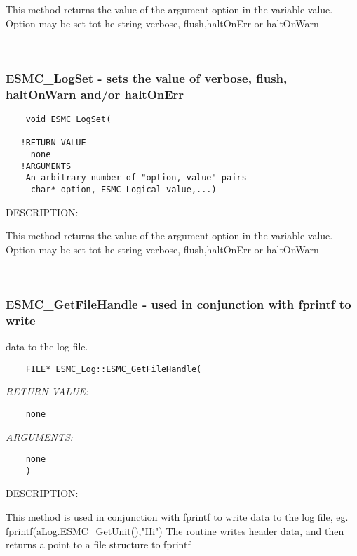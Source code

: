     This method returns the value of the argument option in the variable value.
    Option may be set tot he string verbose, flush,haltOnErr or haltOnWarn 
 
\mbox{}\hrulefill\ 
 
\subsubsection [ESMC\_LogSet] {ESMC\_LogSet - sets the value of verbose, flush, haltOnWarn and/or haltOnErr}


  
\begin{verbatim}    void ESMC_LogSet(
 
   !RETURN VALUE 
     none
   !ARGUMENTS
    An arbitrary number of "option, value" pairs
     char* option, ESMC_Logical value,...) \end{verbatim}
{\sf DESCRIPTION:\\ }


   This method returns the value of the argument option in the variable value.
   Option may be set tot he string verbose, flush,haltOnErr or haltOnWarn 
 
\mbox{}\hrulefill\ 
 
\subsubsection [ESMC\_GetFileHandle] {ESMC\_GetFileHandle - used in conjunction with fprintf to write}


   data to the log file.
  
\begin{verbatim}    FILE* ESMC_Log::ESMC_GetFileHandle(\end{verbatim}{\em RETURN VALUE:}
\begin{verbatim}    none\end{verbatim}{\em ARGUMENTS:}
\begin{verbatim}    none
    )\end{verbatim}
{\sf DESCRIPTION:\\ }


   This method is used in conjunction with fprintf 
   to write data to the log file, eg. fprintf(aLog.ESMC\_GetUnit(),"Hi")
   The routine writes header data, and
   then returns a point to a file structure to fprintf
   
